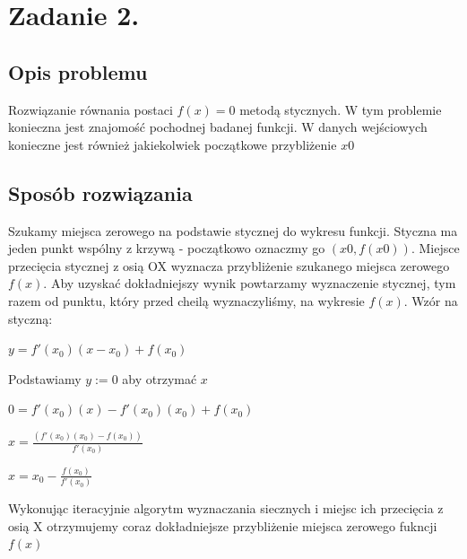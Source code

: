 \documentclass[12pt]{article}
\begin{document}
\section{Zadanie 2.}

\subsection{Opis problemu}
Rozwiązanie równania postaci $ f(x) = 0 $ metodą stycznych.
W tym problemie konieczna jest znajomość pochodnej badanej funkcji.
W danych wejściowych konieczne jest również jakiekolwiek początkowe przybliżenie $x0$

\subsection{Sposób rozwiązania}
Szukamy miejsca zerowego na podstawie stycznej do wykresu funkcji.\newline
Styczna ma jeden punkt wspólny z krzywą - początkowo oznaczmy go $(x0, f(x0))$.
Miejsce przecięcia stycznej z osią OX wyznacza przybliżenie szukanego miejsca zerowego $f(x)$. \newline
Aby uzyskać dokładniejszy wynik powtarzamy wyznaczenie stycznej, tym razem od punktu, który przed cheilą wyznaczyliśmy, 
na wykresie $f(x)$. \newline 
Wzór na styczną: 
\begin{center}
    $y = f'(x_{0})(x - x_{0}) + f(x_{0})$
\end{center}
Podstawiamy $y := 0$ aby otrzymać $x$
\begin{center}
    $0 = f'(x_0)(x) - f'(x_0)(x_0) + f(x_0)$
\end{center}
\begin{center}
    $x =  \frac{(f'(x_0)(x_0) - f(x_0))}{f'(x_0)}$
\end{center}
\begin{center}
    $x = x_0 - \frac{f(x_0)}{f'(x_0)}$
\end{center}
Wykonując iteracyjnie algorytm wyznaczania siecznych i miejsc ich przecięcia z osią X otrzymujemy coraz dokładniejsze 
przybliżenie miejsca zerowego fukncji $f(x)$
\end{document}
